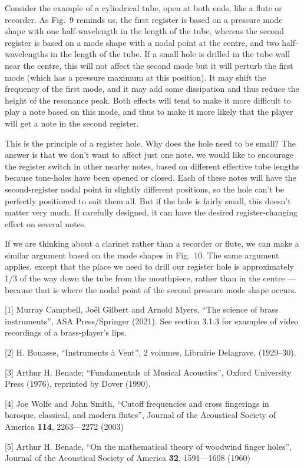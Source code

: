   Consider the example of a cylindrical tube, open at both ends, like a flute 
  or recorder. As Fig.\ 9 reminds us, the first register is based on a pressure 
  mode shape with one half-wavelength in the length of the tube, whereas the 
  second register is based on a mode shape with a nodal point at the centre, 
  and two half-wavelengths in the length of the tube. If a small hole is 
  drilled in the tube wall near the centre, this will not affect the second 
  mode but it will perturb the first mode (which has a pressure maximum at this 
  position). It may shift the frequency of the first mode, and it may add some 
  dissipation and thus reduce the height of the resonance peak. Both effects 
  will tend to make it more difficult to play a note based on this mode, and 
  thus to make it more likely that the player will get a note in the second 
  register. 

  This is the principle of a register hole. Why does the hole need to be small? 
  The answer is that we don’t want to affect just one note, we would like to 
  encourage the register switch in other nearby notes, based on different 
  effective tube lengths because tone-holes have been opened or closed. Each of 
  these notes will have the second-register nodal point in slightly different 
  positions, so the hole can’t be perfectly positioned to suit them all. But if 
  the hole is fairly small, this doesn’t matter very much. If carefully 
  designed, it can have the desired register-changing effect on several notes. 

  If we are thinking about a clarinet rather than a recorder or flute, we can 
  make a similar argument based on the mode shapes in Fig.\ 10. The same 
  argument applies, except that the place we need to drill our register hole is 
  approximately 1/3 of the way down the tube from the mouthpiece, rather than 
  in the centre — because that is where the nodal point of the second pressure 
  mode shape occurs. 



  \sectionreferences{}[1] Murray Campbell, Joël Gilbert and Arnold Myers, “The 
  science of brass instruments”, ASA Press/Springer (2021). See section 3.1.3 
  for examples of video recordings of a brass-player's lips. 

  [2] H. Bouasse, “Instruments à Vent”, 2 volumes, Librairie Delagrave, 
  (1929–30). 

  [3] Arthur H. Benade; “Fundamentals of Musical Acoustics”, Oxford University 
  Press (1976), reprinted by Dover (1990). 

  [4] Joe Wolfe and John Smith, “Cutoff frequencies and cross fingerings in 
  baroque, classical, and modern flutes”, Journal of the Acoustical Society of 
  America \textbf{114}, 2263—2272 (2003) 

  [5] Arthur H. Benade, “On the mathematical theory of woodwind finger holes”, 
  Journal of the Acoustical Society of America \textbf{32}, 1591—1608 (1960) 